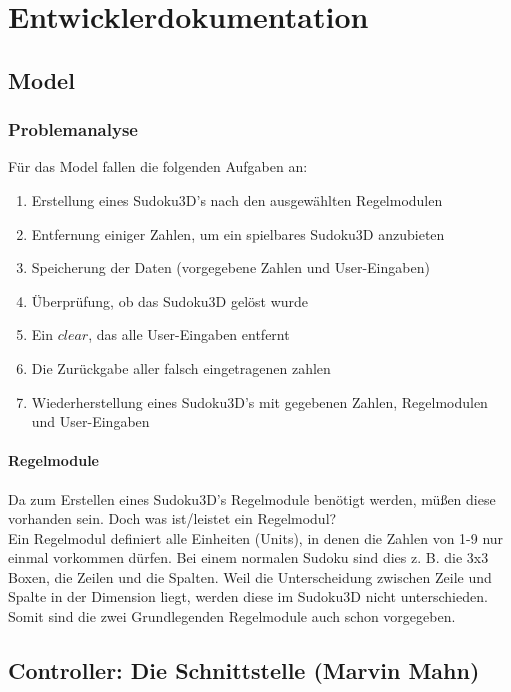 \documentclass[a4paper,12pt]{scrreprt}
\begin{document}
	\chapter{Entwicklerdokumentation}
	\section{Model}
	\subsection{Problemanalyse}
	F\"ur das Model fallen die folgenden Aufgaben an:
	\begin{enumerate}
		\item Erstellung eines Sudoku3D's nach den ausgew\"ahlten Regelmodulen
		\item Entfernung einiger Zahlen, um ein spielbares Sudoku3D anzubieten
		\item Speicherung der Daten (vorgegebene Zahlen und User-Eingaben)
		\item \"Uberpr\"ufung, ob das Sudoku3D gel\"ost wurde
		\item Ein $clear$, das alle User-Eingaben entfernt
		\item Die Zur\"uckgabe aller falsch eingetragenen zahlen
		\item Wiederherstellung eines Sudoku3D's mit gegebenen Zahlen, Regelmodulen und
			User-Eingaben
	\end{enumerate}

	\subsubsection{Regelmodule}
	Da zum Erstellen eines Sudoku3D's Regelmodule ben\"otigt werden, m\"u{\ss}en diese vorhanden
	sein. Doch was ist/leistet ein Regelmodul?\medskip \\
	Ein Regelmodul definiert alle Einheiten (Units), in denen die Zahlen von 1-9 nur einmal vorkommen
	d\"urfen. Bei einem normalen Sudoku sind dies z. B. die 3x3 Boxen, die Zeilen und die Spalten.
	Weil die Unterscheidung zwischen Zeile und Spalte in der Dimension liegt, werden diese im
	Sudoku3D nicht unterschieden. Somit sind die zwei Grundlegenden Regelmodule auch schon
	vorgegeben.

	\section{Controller: Die Schnittstelle (Marvin Mahn)}
\end{document}
